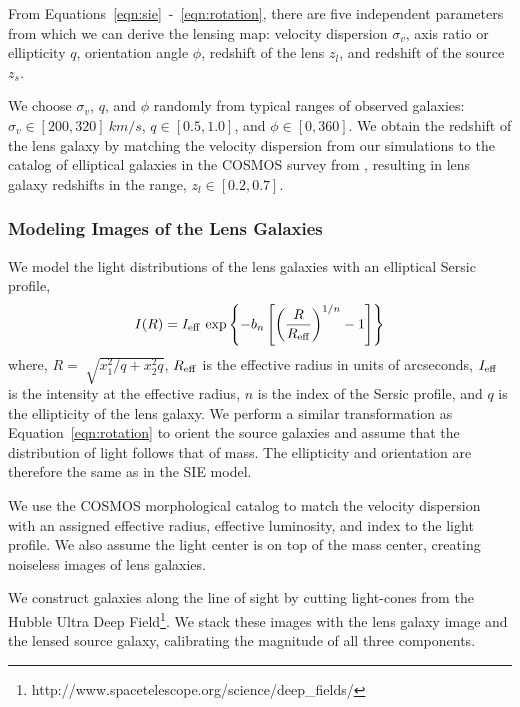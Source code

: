\documentclass{emulateapj}
\begin{document}
From Equations~\ref{eqn:sie}~-~\ref{eqn:rotation}, there are five
independent parameters from which we can derive the lensing map:
velocity dispersion $\sigma_v$, axis ratio or ellipticity $q$,
orientation angle $\phi$, redshift of the lens $z_l$, and redshift of
the source $z_s$.  

We choose $\sigma_v$, $q$, and $\phi$ randomly from typical ranges of
observed galaxies: $\sigma_v \in [200, 320]~km/s$, $q \in [0.5, 1.0]$,
and $\phi \in [0, 360]$.  We obtain the redshift of the lens galaxy by
matching the velocity dispersion from our simulations to the catalog
of elliptical galaxies in the COSMOS survey from \citet{zahid_etal15},
resulting in lens galaxy redshifts in the range, $z_l \in [0.2,0.7]$.

\subsubsection{Modeling Images of the Lens Galaxies}
We model the light distributions of the lens galaxies with an
elliptical Sersic profile,
\begin{equation}\label{eqn:sersic} 
I(R) = I_{\rm eff}~{\rm exp} \left\lbrace -b_{n} \left[ \left(
  \frac{R}{R_{\rm eff}}\right)^{1/n} - 1 \right ]
\right\rbrace 
\end{equation}
where, $R = \sqrt[]{x_1^2 /q+x_2^2 q }$, $R_{\rm eff}$ is the
effective radius in units of arcseconds, $I_{\rm eff}$ is the
intensity at the effective radius, $n$ is the index of the Sersic
profile, and $q$ is the ellipticity of the lens galaxy.  We perform a
similar transformation as Equation~\ref{eqn:rotation} to orient the
source galaxies and assume that the distribution of light follows that
of mass.  The ellipticity and orientation are therefore the same as in
the SIE model.

We use the COSMOS morphological catalog \citep{zahid_etal15} to match
the velocity dispersion with an assigned effective radius, effective
luminosity, and index to the light profile.  We also assume the light
center is on top of the mass center, creating noiseless images of lens
galaxies.

We construct galaxies along the line of sight by cutting light-cones
from the Hubble Ultra Deep
Field\footnote{http://www.spacetelescope.org/science/deep\_fields/}.
We stack these images with the lens galaxy image and the lensed source
galaxy, calibrating the magnitude of all three components.
\end{document}
